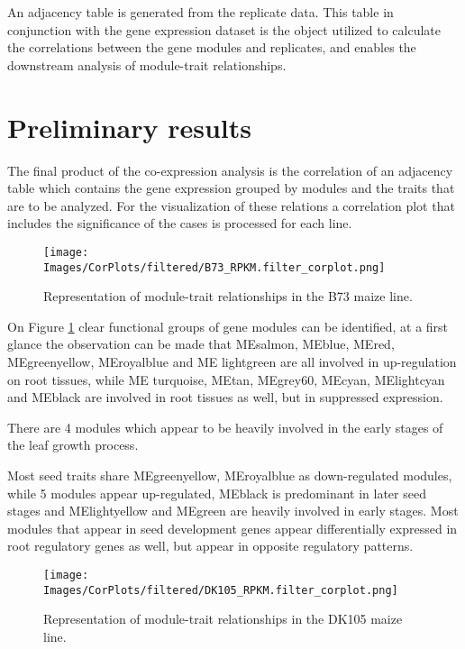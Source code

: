 \documentclass[
]{article}
\begin{document}
An adjacency table is generated from the replicate data. This table in
conjunction with the gene expression dataset is the object utilized to
calculate the correlations between the gene modules and replicates, and
enables the downstream analysis of module-trait relationships.

\hypertarget{preliminary-results}{%
\section{Preliminary results}\label{preliminary-results}}

The final product of the co-expression analysis is the correlation of an
adjacency table which contains the gene expression grouped by modules
and the traits that are to be analyzed. For the visualization of these
relations a correlation plot that includes the significance of the cases
is processed for each line.

\begin{figure}[H]
  \centering
  \texttt{[image: Images/CorPlots/filtered/B73\_RPKM.filter\_corplot.png]}
  \caption[B73 Correlation Plot]{\small Representation of module-trait relationships in the B73 maize line.}
    \label{fig:B73_CorPlot}
\end{figure}

On Figure \ref{fig:B73_CorPlot} clear functional groups of gene modules can be identified,
at a first glance the observation can be made that MEsalmon, MEblue,
MEred, MEgreenyellow, MEroyalblue and ME lightgreen are all involved in
up-regulation on root tissues, while ME turquoise, MEtan, MEgrey60,
MEcyan, MElightcyan and MEblack are involved in root tissues as well,
but in suppressed expression.

There are 4 modules which appear to be heavily involved in the early
stages of the leaf growth process.

Most seed traits share MEgreenyellow, MEroyalblue as down-regulated
modules, while 5 modules appear up-regulated, MEblack is predominant in
later seed stages and MElightyellow and MEgreen are heavily involved in
early stages. Most modules that appear in seed development genes appear
differentially expressed in root regulatory genes as well, but appear in
opposite regulatory patterns.

\begin{figure}[H]
  \centering
  \texttt{[image: Images/CorPlots/filtered/DK105\_RPKM.filter\_corplot.png]}
  \caption[DK105 Correlation Plot]{\small Representation of module-trait relationships in the DK105 maize line.}
    \label{fig:DK105_CorPlot}
\end{figure}
\end{document}
